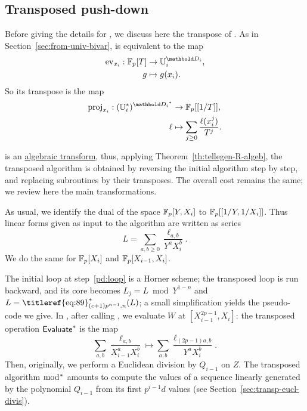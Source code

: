 
\subsection{Transposed push-down}

Before giving the details for , we discuss here
the transpose of .  As in
Section~\ref{sec:from-univ-bivar},  is
equivalent to the map
\begin{equation}
  \label{eq:81}
  \begin{aligned}
    \ev_{x_i}:\F_p[T] &\ra \U_i^{\basis{D}_i}\text{,}\\ 
    g&\mapsto g(x_i)\text{.}
  \end{aligned}
\end{equation}
So its transpose is the map
\begin{equation}
  \label{eq:82}
  \begin{aligned}
    \proj_{x_i}:(\dual{\U_i})^{\dual{\basis{D_i}}}&\ra\F_p[[1/T]]\text{,}\\
    \ell&\mapsto\sum_{j\ge0}\frac{\ell(x_i^j)}{T^j}\text{.}
  \end{aligned}
\end{equation}

 is an \hyperref[sec:r-algebraic-transforms]{algebraic
  transform}, thus, applying Theorem~\ref{th:tellegen-R-algeb}, the
transposed algorithm is obtained by reversing the initial algorithm
step by step, and replacing subroutines by their transposes. The
overall cost remains the same; we review here the main
transformations.

As usual, we identify the dual of the space $\mathbb{F}_p[Y,X_i]$ to
$\mathbb{F}_p[[1/Y,1/X_i]]$. Thus linear forms given as input to the algorithm
are written as series
\begin{equation}
  \label{eq:84}
  L=\sum_{a,b\ge0}\frac{\ell_{a,b}}{Y^aX_i^b}
  \text{.}
\end{equation}
We do the same for $\mathbb{F}_p[X_i]$ and $\mathbb{F}_p[X_{i-1},X_i]$.

The initial loop at step~\ref{pd:loop} is a Horner scheme; the
transposed loop is run backward, and its core becomes $L_j=L\bmod
Y^{1-n}$ and $L=\dual{\text{\titleref{eq:89}}_{(c+1)p^{n-1},n}}(L)$; a small
simplification yields the pseudo-code we give.  In
, after calling ,
we evaluate $W$ at $[X_{i-1}^{2p-1},X_i]$: the transposed operation
$\text{\textup{\textsf{Evaluate}}}^\ast$ is the map
\begin{equation}
  \label{eq:83}
  \sum_{a,b} \frac{\ell_{a,b}}{X_{i-1}^a X_i^b} \mapsto
  \sum_{a,b} \frac{\ell_{(2p-1)a,b}}{Y^a X_i^b}
  \text{.} 
\end{equation}
Then, originally, we perform a Euclidean division by $Q_{i-1}$ on
$Z$. The transposed algorithm
$\bmod^\ast$ amounts to compute the values of a sequence linearly
generated by the polynomial $Q_{i-1}$ from its first $p^{i-1}d$ values
(see Section~\ref{sec:transp-eucl-divis}).

